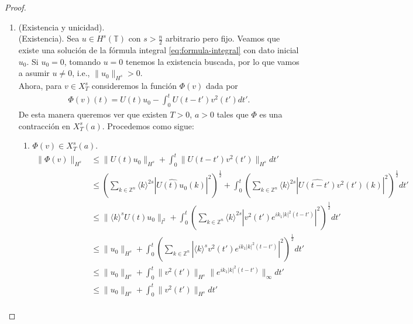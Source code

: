     \begin{proof}
        \begin{enumerate}
            \item (Existencia y unicidad).\\
                (Existencia).
                    Sea $u \in H^{s}(\mathbb{T})$ con $s> \frac{n}{2}$ arbitrario pero fijo. Veamos que existe una solución de la fórmula integral \textcolor{red}{\ref{eq:formula-integral}} con dato inicial $u_{0}$. Si $u_{0}=0$, tomando $u=0$ tenemos la existencia buscada, por lo que vamos a asumir $u \neq 0$, i.e., $\|u_{0}\|_{H^{s}} > 0$.\\
                    Ahora, para $v \in X^{s}_{T}$ consideremos la función $\Phi (v)$ dada por
                    \begin{align*}
                        \Phi (v) (t) = U(t)u_{0} - \int_{0}^{t} U(t-t') v^{2}(t') dt'.
                    \end{align*} 
                    De esta manera queremos ver que existen $T>0$, $a>0$ tales que $\Phi$ es una contracción en $X^{s}_{T}(a)$. Procedemos como sigue:
                    \begin{enumerate}
                        \item $\Phi (v) \in X^{s}_{T}(a)$.
                        \begin{align*}
                            \|\Phi (v)\|_{H^{s}} &\leq \|U(t)u_{0}\|_{H^{s}} + \int_{0}^{t} \|U(t-t')v^{2}(t')\|_{H^{s}}dt'\\ 
                            &\leq  \left(\sum_{k \in \mathbb{Z}^{n}} \langle k \rangle ^{2s} |\hat{U(t)u_{0}}(k)|^{2} \right) ^{\frac{1}{2}} + \int_{0}^{t} \left(\sum_{k \in \mathbb{Z}^{n}} \langle k \rangle ^{2s} |\hat{U(t-t')}v^{2}(t') (k)|^{2} \right) ^{\frac{1}{2}} dt'\\ 
                            &\leq \|\langle k \rangle ^{s} U(t)u_{0}\|_{l^2} + \int_{0}^{t} \left(\sum_{k \in \mathbb{Z}^{n}} \langle k \rangle ^{2s} |v^{2}(t') e^{i k_{1}|k|^{2}(t-t')}|^{2} \right) ^{\frac{1}{2}} dt'\\ 
                            &\leq \|u_{0}\|_{H^{s}} + \int_{0}^{t} \left(\sum_{k \in \mathbb{Z}^{n}} |\langle k \rangle ^{s} v^{2}(t') e^{i k_{1}|k|^{2}(t-t')}|^{2} \right) ^{\frac{1}{2}} dt'\\
                            &\leq \|u_{0}\|_{H^{s}} + \int_{0}^{t} \| v^{2}(t')\|_{H^{s}} \|e^{i k_{1}|k|^{2}(t-t')}\|_{\infty}  dt'\\
                            &\leq \|u_{0}\|_{H^{s}} + \int_{0}^{t} \| v^{2}(t')\|_{H^{s}} dt'\\

\end{align*}
\end{enumerate}
\end{enumerate}
\end{proof}
